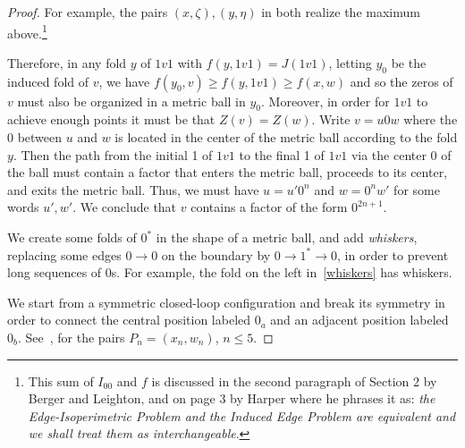 \documentclass{article}
\begin{document}
\begin{proof}
	For example, the pairs $(x,\zeta), (y,\eta)$ in  both realize the maximum above.\footnote{This sum of $I_{00}$ and $f$
	is discussed in the second paragraph of Section 2 by Berger and Leighton, and
	on page 3 by Harper where he phrases it as: \emph{the Edge-Isoperimetric Problem and the Induced Edge Problem are equivalent and we shall treat them as interchangeable}.}
	
	Therefore, in any fold $y$ of $1v1$ with $f(y,1v1)=J(1v1)$, letting $y_0$ be the induced fold of $v$,
	we have $f(y_0,v) \ge f(y,1v1)\ge f(x,w)$ and so the zeros of $v$ must also be organized in a metric ball in $y_0$.
	Moreover, in order for $1v1$ to achieve enough points it must be that $Z(v)=Z(w)$.
	Write $v=u0w$ where the 0 between $u$ and $w$ is located in the center of the metric ball according to the fold $y$.
	Then the path from the initial 1 of $1v1$ to the final 1 of $1v1$ via the center 0 of the ball must contain a factor that enters the metric ball,
	proceeds to its center, and exits the metric ball.
	Thus, we must have $u=u' 0^n$ and $w = 0^n w'$ for some words $u',w'$.
	We conclude that $v$ contains a factor of the form $0^{2n+1}$.
	
	We create some folds of $0^*$ in the shape of a metric ball, and add \emph{whiskers}, replacing some edges $0\to 0$ on the boundary by $0\to 1^*\to 0$,
	in order to prevent long sequences of 0s. For example, the fold on the left in~\eqref{whiskers} has whiskers.

	We start from a symmetric closed-loop configuration and break its symmetry in order to connect the central position labeled $0_a$ and an adjacent position labeled $0_b$.
	See~,  for the pairs $P_n=(x_n,w_n)$, $n\le 5$.
\end{proof}
\end{document}
